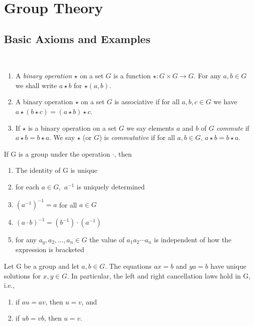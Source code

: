 \documentclass[../main]{subfiles}
\begin{document}
 
 \section{Group Theory}
 
 \subsection{Basic Axioms and Examples}
 
 
 \begin{dfn}
  ~\begin{enumerate}
   \item A \textit{binary operation} $\star$ on a set $G$ is a function $\star \colon G\times G \to G$. For any $a,b\in G$ we shall write $a\star b$ for $\star (a,b)$.
   \item A binary operation $\star$ on a set $G$ is associative if for all $a,b,c\in G$ we have $a\star (b\star c)=(a\star b)\star c$.
   \item If $\star$ is a binary operation on a set $G$ we say elements $a$ and $b$ of $G$ \textit{commute} if $a\star b = b\star a$. We say $\star$ (or $G$) is \textit{commutative} if for all $a,b\in G$, $a\star b = b\star a$.
  \end{enumerate}
 \end{dfn}
 
 \begin{prop}
  If G is a group under the operation $\cdot$, then
  \begin{enumerate}
   \item The identity of G is unique 
   \item for each $a \in G,$ $a^{-1}$ is uniquely determined
   \item $(a^{-1})^{-1} = a$ for all $a \in G$
   \item $(a\cdot b)^{-1}=(b^{-1})\cdot(a^{-1})$
   \item for any $a_q,a_2, \ldots,a_n\in G$ the value of $a_1 a_2 \cdots a_n$ is independent of how the expression is bracketed 
  \end{enumerate}
 \end{prop}

 \begin{prop}
  Let G be a group and let $a,b\in G$. The equations $ax=b$ and $ya=b$ have unique solutions for $x,y \in G$. In particular, the left and right cancellation laws hold in G, i.e.,
  \begin{enumerate}
   \item if $au=av$, then $u=v$, and 
   \item if $ub=vb$, then $u=v$.
  \end{enumerate}
 \end{prop}
\end{document}
